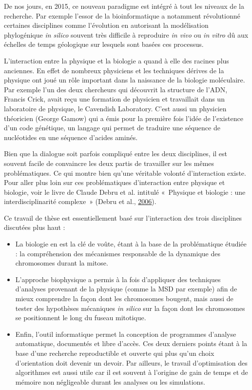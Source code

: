 \documentclass[12pt,a4paper,twoside,openright]{book}
\begin{document}
De nos jours, en 2015, ce nouveau paradigme est intégré à tout les
niveaux de la recherche. Par exemple l'essor de la bioinformatique a
notamment révolutionné certaines disciplines comme l'évolution en
autorisant la modélisation phylogénique \emph{in silico} souvent très
difficile à reproduire \emph{in vivo} ou \emph{in vitro} dû aux échelles
de temps géologique sur lesquels sont basées ces processus.

L'interaction entre la physique et la biologie a quand à elle des
racines plus anciennes. En effet de nombreux physiciens et les
techniques dérives de la physique ont joué un rôle important dans la
naissance de la biologie moléculaire. Par exemple l'un des deux
chercheurs qui découvrit la structure de l'ADN, Francis Crick, avait
reçu une formation de physicien et travaillait dans un laboratoire de
physique, le Cavendish Laboratory. C'est aussi un physicien théoricien
(George Gamow) qui a émis pour la première fois l'idée de l'existence
d'un code génétique, un langage qui permet de traduire une séquence de
nucléotides en une séquence d'acides aminés.

Bien que la dialogue soit parfois compliqué entre les deux disciplines,
il est souvent facile de convaincre les deux partis de travailler sur
les mêmes problématiques. Ce qui montre bien qu'une véritable volonté
d'interaction existe. Pour aller plus loin sur ces problématiques
d'interaction entre physique et biologie, voir le livre de Claude Debru
et al. intitulé «~Physique et biologie : une interdisciplinarité
complexe~» (Debru et al., \protect\hyperlink{ref-Debru}{2006}).

Ce travail de thèse est essentiellement basé sur l'interaction des trois
disciplines discutées plus haut :

\begin{itemize}
\item
  La biologie en est la clé de voûte, étant à la base de la
  problématique étudiée : la compréhension des mécanismes responsable de
  la dynamique des chromosomes durant la mitose.
\item
  L'approche biophysique a permis à la fois d'appliquer des techniques
  d'analyses provenant de la physique (comme la MSD par exemple) afin de
  mieux comprendre la façon dont les chromosomes bougent, mais aussi de
  tester des hypothèses mécaniques \emph{in silico} sur la façon dont
  les chromosomes se positionnent le long du fuseau mitotique.
\item
  Enfin, l'outil informatique permet la conception de programmes
  d'analyse automatique, documentés et libre d'accès. Ces deux derniers
  points étant à la base d'une recherche reproductible et ouverte qui
  plus qu'un choix d'orientation doit devenir un devoir. Par ailleurs,
  le travail d'optimisation des algorithmes est aussi utile car il est
  souvent à l'origine de gain de temps et de mémoire non négligeable
  durant les analyses ou les simulations.
\end{itemize}
\end{document}

